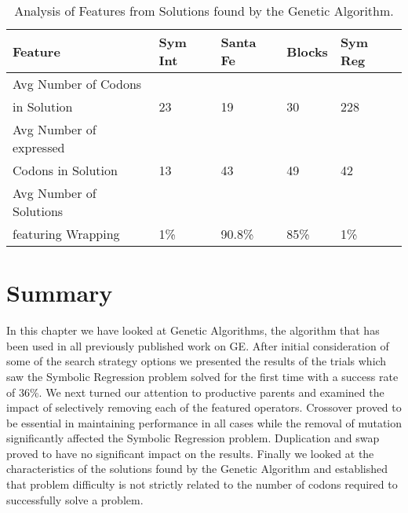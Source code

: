 \begin{table}[h]
\begin{center}
\begin{tabular}{|l|l|l|l|l|}
\hline
Feature & Sym Int & Santa Fe & Blocks & Sym Reg  \\
\hline
Avg Number of Codons & & & &  \\ 
in Solution & 23 & 19 & 30 & 228  \\
Avg Number of expressed & & & &  \\
Codons in Solution & 13 & 43 & 49 & 42  \\
Avg Number of Solutions & & & &  \\
featuring Wrapping & 1\% & 90.8\% & 85\% & 1\%  \\
\hline
\end{tabular}
\caption{\label{ga_results_analysis_table} Analysis of Features from Solutions found by the Genetic Algorithm.}
\end{center}
\end{table}

\section{Summary}
In this chapter we have looked at Genetic Algorithms, the algorithm that has been used in all previously published work on GE. After initial consideration of some of the search strategy options we presented the results of the trials which saw the Symbolic Regression problem solved for the first time with a success rate of 36\%. We next turned our attention to productive parents and examined the impact of selectively removing each of the featured operators. Crossover proved to be essential in maintaining performance in all cases while the removal of mutation significantly affected the Symbolic Regression problem. Duplication and swap proved to have no significant impact on the results. Finally we looked at the characteristics of the solutions found by the Genetic Algorithm and established that problem difficulty is not strictly related to the number of codons required to successfully solve a problem. 































